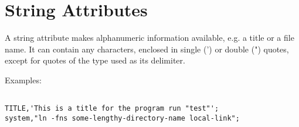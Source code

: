 
\section{String Attributes}

A string attribute makes alphanumeric information available, e.g. a
title or a file name. It can contain any characters, enclosed in single
(') or double (") quotes, except for quotes of the type used as its
delimiter.  

 Examples: 
\begin{verbatim}

TITLE,'This is a title for the program run "test"';
system,"ln -fns some-lengthy-directory-name local-link";
\end{verbatim}

